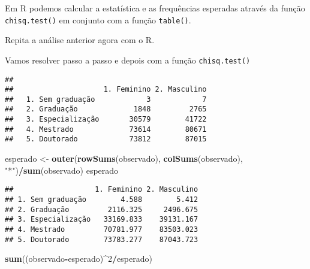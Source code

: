 \documentclass[11pt,]{style/krantz}
\makeatletter
\newenvironment{Shaded}{\begin{snugshade}}{\end{snugshade}}
\newcommand{\CommentTok}[1]{\textcolor[rgb]{0.56,0.35,0.01}{\textit{#1}}}
\newcommand{\DecValTok}[1]{\textcolor[rgb]{0.00,0.00,0.81}{#1}}
\newcommand{\KeywordTok}[1]{\textcolor[rgb]{0.13,0.29,0.53}{\textbf{#1}}}
\newcommand{\NormalTok}[1]{#1}
\newcommand{\OperatorTok}[1]{\textcolor[rgb]{0.81,0.36,0.00}{\textbf{#1}}}
\newcommand{\StringTok}[1]{\textcolor[rgb]{0.31,0.60,0.02}{#1}}
\newenvironment{kframe}{%
\medskip{}
\setlength{\fboxsep}{.8em}
 \def\at@end@of@kframe{}%
 \ifinner\ifhmode%
  \def\at@end@of@kframe{\end{minipage}}%
  \begin{minipage}{\columnwidth}%
 \fi\fi%
 \def\FrameCommand##1{\hskip\@totalleftmargin \hskip-\fboxsep
 \colorbox{shadecolor}{##1}\hskip-\fboxsep
     \hskip-\linewidth \hskip-\@totalleftmargin \hskip\columnwidth}%
 \MakeFramed {\advance\hsize-\width
   \@totalleftmargin\z@ \linewidth\hsize
   \@setminipage}}%
 {\par\unskip\endMakeFramed%
 \at@end@of@kframe}
\renewenvironment{Shaded}{\begin{kframe}}{\end{kframe}}
\theoremstyle{definition}
\theoremstyle{definition}
\theoremstyle{definition}
\theoremstyle{remark}
\let\BeginKnitrBlock\begin \let\EndKnitrBlock\end
\makeatother
\begin{document}
Em R podemos calcular a estatística e as frequências esperadas através da função \texttt{chisq.test()} em conjunto com a função \texttt{table()}.

\BeginKnitrBlock{example}
\protect\hypertarget{exm:unnamed-chunk-91}{}{\label{exm:unnamed-chunk-91} }Repita a análise anterior agora com o R.
\EndKnitrBlock{example}

\BeginKnitrBlock{solution}
\iffalse{} {Solução. } \fi{}Vamos resolver passo a passo e depois com a função \texttt{chisq.test()}
\EndKnitrBlock{solution}

\begin{Shaded}
\end{Shaded}

\begin{verbatim}
##                    
##                     1. Feminino 2. Masculino
##   1. Sem graduação            3            7
##   2. Graduação             1848         2765
##   3. Especialização       30579        41722
##   4. Mestrado             73614        80671
##   5. Doutorado            73812        87015
\end{verbatim}

\begin{Shaded}
\begin{Highlighting}[]
\NormalTok{esperado  <-}\StringTok{ }\KeywordTok{outer}\NormalTok{(}\KeywordTok{rowSums}\NormalTok{(observado), }\KeywordTok{colSums}\NormalTok{(observado), }\StringTok{"*"}\NormalTok{)}\OperatorTok{/}\KeywordTok{sum}\NormalTok{(observado)}
\NormalTok{esperado}
\end{Highlighting}
\end{Shaded}

\begin{verbatim}
##                   1. Feminino 2. Masculino
## 1. Sem graduação        4.588        5.412
## 2. Graduação         2116.325     2496.675
## 3. Especialização   33169.833    39131.167
## 4. Mestrado         70781.977    83503.023
## 5. Doutorado        73783.277    87043.723
\end{verbatim}

\begin{Shaded}
\begin{Highlighting}[]
\KeywordTok{sum}\NormalTok{((observado}\OperatorTok{-}\NormalTok{esperado)}\OperatorTok{^}\DecValTok{2}\OperatorTok{/}\NormalTok{esperado)}
\end{Highlighting}
\end{Shaded}
\end{document}
